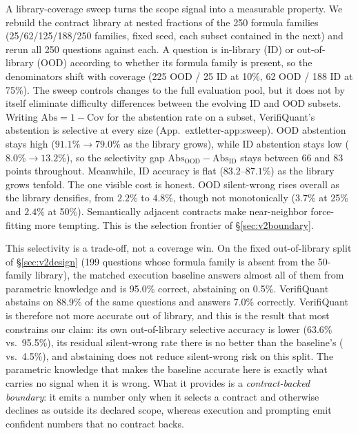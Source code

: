 \documentclass[sigconf]{acmart}
\newif\ifarxiv
\newcommand{\extref}[1]{App.~\ifarxiv\ref{#1}\else\csname extletter-#1\endcsname\fi}
\newcommand{\oodVQabsOOD}{88.9\%}   \newcommand{\oodVQabsID}{19.6\%}   \newcommand{\oodVQgap}{69.3}
\newcommand{\oodVQcorrOOD}{7.0\%}   %
\newcommand{\oodVQselOOD}{63.6\%}   \newcommand{\oodRPALselOOD}{95.5\%}  \newcommand{\oodCoTselOOD}{89.9\%}
\newcommand{\oodRPALabsOOD}{0.5\%}
\newcommand{\oodRPALcorrOOD}{95.0\%}
\newcommand{\oodRPALswOOD}{4.5\%}
\begin{document}
A library-coverage sweep turns the scope signal into a measurable property.
We rebuild the contract library at nested fractions of the 250 formula families (25/62/125/188/250 families, fixed seed, each subset contained in the next) and rerun all 250 questions against each. A question is in-library (ID) or out-of-library (OOD) according to whether its formula family is present, so the denominators shift with coverage (225 OOD / 25 ID at 10\%, 62 OOD / 188 ID at 75\%).
The sweep controls changes to the full evaluation pool, but it does not by itself eliminate difficulty differences between the evolving ID and OOD subsets.
Writing $\mathrm{Abs}=1-\mathrm{Cov}$ for the abstention rate on a subset, VerifiQuant's abstention is selective at every size (\extref{app:sweep}). OOD abstention stays high ($91.1\%{\to}79.0\%$ as the library grows), while ID abstention stays low ($8.0\%{\to}13.2\%$), so the selectivity gap $\mathrm{Abs}_{\mathrm{OOD}}-\mathrm{Abs}_{\mathrm{ID}}$ stays between $66$ and $83$ points throughout. Meanwhile, ID accuracy is flat ($83.2$--$87.1\%$) as the library grows tenfold.
The one visible cost is honest. OOD silent-wrong rises overall as the library densifies, from $2.2\%$ to $4.8\%$, though not monotonically ($3.7\%$ at 25\% and $2.4\%$ at 50\%). Semantically adjacent contracts make near-neighbor force-fitting more tempting. This is the selection frontier of \S\ref{sec:v2boundary}.

This selectivity is a trade-off, not a coverage win.
On the fixed out-of-library split of \S\ref{sec:v2design} (199 questions whose formula family is absent from the 50-family library), the matched execution baseline answers almost all of them from parametric knowledge and is \oodRPALcorrOOD{} correct, abstaining on \oodRPALabsOOD{}. VerifiQuant abstains on \oodVQabsOOD{} of the same questions and answers \oodVQcorrOOD{} correctly. VerifiQuant is therefore not more accurate out of library, and this is the result that most constrains our claim: its own out-of-library selective accuracy is lower (\oodVQselOOD{} vs.\ \oodRPALselOOD{}), its residual silent-wrong rate there is no better than the baseline's (\oodVQswOOD{} vs.\ \oodRPALswOOD{}), and abstaining does not reduce silent-wrong risk on this split. The parametric knowledge that makes the baseline accurate here is exactly what carries no signal when it is wrong.
What it provides is a \emph{contract-backed boundary}: it emits a number only when it selects a contract and otherwise declines as outside its declared scope, whereas execution and prompting emit confident numbers that no contract backs.
\end{document}
